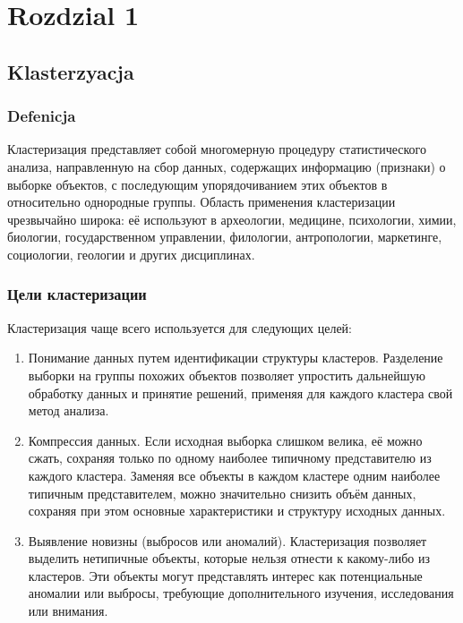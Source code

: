 \chapter{Rozdzial 1}

\section{Klasterzyacja}

	\subsection{Defenicja}
		Кластеризация представляет собой многомерную процедуру статистического анализа, направленную на сбор данных, содержащих информацию (признаки) о выборке объектов, с последующим упорядочиванием этих объектов в относительно однородные группы. Область применения кластеризации чрезвычайно широка: её используют в археологии, медицине, психологии, химии, биологии, государственном управлении, филологии, антропологии, маркетинге, социологии, геологии и других дисциплинах. \cite{Clustering}
	
	\subsection{Цели кластеризации}
		Кластеризация чаще всего используется для следующих целей:
		\begin{enumerate}
			\item Понимание данных путем идентификации структуры кластеров. Разделение выборки на группы похожих 	объектов позволяет упростить дальнейшую обработку данных и принятие решений, применяя для каждого кластера свой метод анализа.
			\item Компрессия данных. Если исходная выборка слишком велика, её можно сжать, сохраняя только по одному наиболее типичному представителю из каждого кластера. Заменяя все объекты в каждом кластере одним наиболее типичным представителем, можно значительно снизить объём данных, сохраняя при этом основные характеристики и структуру исходных данных.
			\item Выявление новизны (выбросов или аномалий). Кластеризация позволяет выделить нетипичные объекты, которые нельзя отнести к какому-либо из кластеров. Эти объекты могут представлять интерес как потенциальные аномалии или выбросы, требующие дополнительного изучения, исследования или внимания.
		\end{enumerate}
	
	
